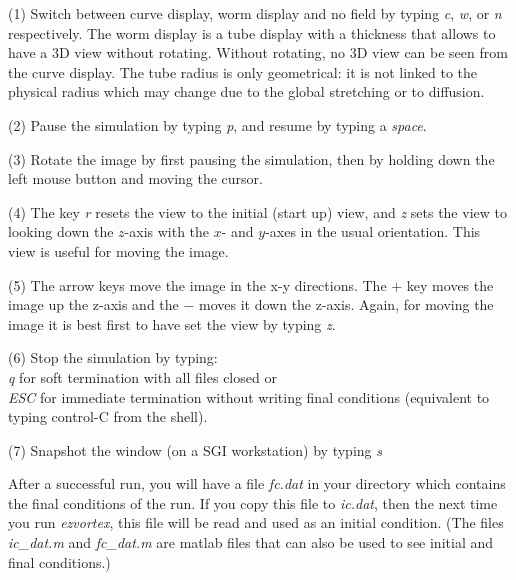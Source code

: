 \begin{list}{dummy}
{\partopsep=-10pt\parsep=-10pt\itemsep=12pt}
\item[(1)] Switch between curve display, worm display and no field by typing
{\em c}, {\em w}, or {\em n} respectively. The worm display is a tube display with a thickness that allows to have a  3D view without rotating. Without rotating, no 3D view can be seen from the curve display. The tube radius is only geometrical: it is not linked to the physical radius which may change due to the global stretching or to diffusion.

\item[(2)] Pause the simulation by typing {\em p}, and resume by
typing a {\em space}.

\item[(3)] Rotate the image by first pausing the simulation, then by
holding down the left mouse button and moving the cursor.

\item[(4)] The key {\em r} resets the view to the initial (start up)
view, and {\em z} sets the view to looking down the $z$-axis with the
$x$- and $y$-axes in the usual orientation.  This view is useful for
moving the image.

\item[(5)] The arrow keys move the image in the x-y directions. The
$+$ key moves the image up the z-axis and the $-$ moves it
down the z-axis.  Again, for moving the image it is best first to
have set the view by typing {\em z}.

\item[(6)] Stop the simulation by typing: \\
{\em q} for soft termination with all files closed or  \\
{\em ESC} for immediate termination without writing final
conditions (equivalent to typing control-C from the shell). 

\item[(7)] Snapshot the window (on a SGI workstation) by typing {\em s}\\

\end{list}

After a successful run, you will have a file {\em fc.dat} in your
directory which contains the final conditions of the run. If you copy
this file to {\em ic.dat}, then the next time you run {\em ezvortex},
this file will be read and used as an initial condition. 
(The files {\em ic\_dat.m} and {\em fc\_dat.m} are matlab files that can also be used to see initial and final conditions.)

